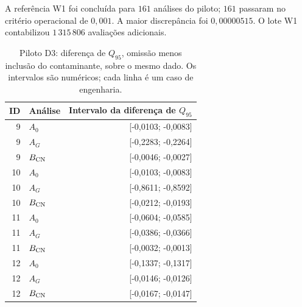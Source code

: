 A referência W1 foi concluída para \(161\) análises do piloto;
\(161\) passaram no critério operacional de \(0,001\).
A maior discrepância foi \(0,00000515\).
O lote W1 contabilizou \(1\,315\,806\) avaliações adicionais.
\begin{table}[htbp]\centering\small
\caption{Piloto D3: diferença de \(Q_{95}\), omissão menos inclusão do contaminante, sobre o mesmo dado. Os intervalos são numéricos; cada linha é um caso de engenharia.}
\label{tab:c09-d3-omissao}
\begin{tabular}{rlr}\toprule
ID & Análise & Intervalo da diferença de \(Q_{95}\) \\ \midrule
9 & \(A_0\) & [-0,0103; -0,0083] \\
9 & \(A_G\) & [-0,2283; -0,2264] \\
9 & \(B_{\rm CN}\) & [-0,0046; -0,0027] \\
10 & \(A_0\) & [-0,0103; -0,0083] \\
10 & \(A_G\) & [-0,8611; -0,8592] \\
10 & \(B_{\rm CN}\) & [-0,0212; -0,0193] \\
11 & \(A_0\) & [-0,0604; -0,0585] \\
11 & \(A_G\) & [-0,0386; -0,0366] \\
11 & \(B_{\rm CN}\) & [-0,0032; -0,0013] \\
12 & \(A_0\) & [-0,1337; -0,1317] \\
12 & \(A_G\) & [-0,0146; -0,0126] \\
12 & \(B_{\rm CN}\) & [-0,0167; -0,0147] \\
\bottomrule\end{tabular}
\end{table}
